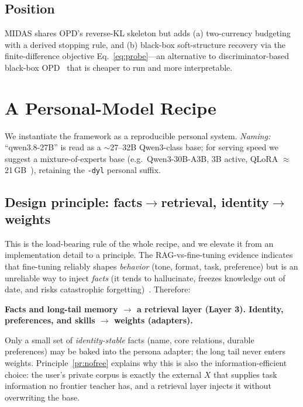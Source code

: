 \documentclass[11pt]{article}
\begin{document}
\subsection{Position}
MIDAS shares OPD's reverse-KL skeleton but adds (a) two-currency budgeting with a derived stopping rule, and (b) black-box soft-structure recovery via the finite-difference objective Eq.~\eqref{eq:probe}---an alternative to discriminator-based black-box OPD~\cite{gad2025} that is cheaper to run and more interpretable.

\section{A Personal-Model Recipe}
\label{sec:recipe}
We instantiate the framework as a reproducible personal system. \emph{Naming:} ``qwen3.8-27B'' is read as a $\sim$27--32B Qwen3-class base; for serving speed we suggest a mixture-of-experts base (e.g.\ Qwen3-30B-A3B, 3B active, QLoRA $\approx$21\,GB~\cite{dettmers2023qlora,qwen3}), retaining the \texttt{-dyl} personal suffix.

\subsection{Design principle: facts$\rightarrow$retrieval, identity$\rightarrow$weights}
\label{sec:division}
This is the load-bearing rule of the whole recipe, and we elevate it from an implementation detail to a principle. The RAG-vs-fine-tuning evidence indicates that fine-tuning reliably shapes \emph{behavior} (tone, format, task, preference) but is an unreliable way to inject \emph{facts} (it tends to hallucinate, freezes knowledge out of date, and risks catastrophic forgetting)~\cite{lewis2020rag,ragft2025}. Therefore:
\begin{center}
\textbf{Facts and long-tail memory $\rightarrow$ a retrieval layer (Layer 3). \quad Identity, preferences, and skills $\rightarrow$ weights (adapters).}
\end{center}
Only a small set of \emph{identity-stable} facts (name, core relations, durable preferences) may be baked into the persona adapter; the long tail never enters weights. Principle~\ref{pr:nofree} explains why this is also the information-efficient choice: the user's private corpus is exactly the external $X$ that supplies task information no frontier teacher has, and a retrieval layer injects it without overwriting the base.
\end{document}
